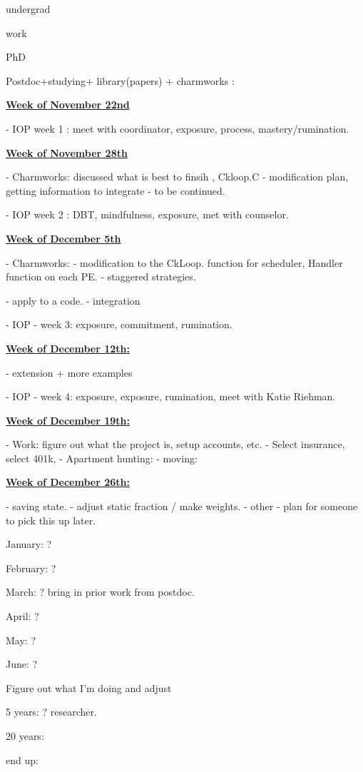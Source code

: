undergrad 



work 

PhD 



Postdoc+studying+  library(papers)  + charmworks : 


\underline{{\bf Week of November 22nd } } 

- IOP week 1 : meet with coordinator, exposure, process,
mastery/rumination. 

\underline{{\bf Week of November 28th } } 

- Charmworks: discussed what is best to finsih ,  Ckloop.C -
modification plan, getting information to integrate - to be
continued.  

- IOP week 2 : DBT, mindfulness, exposure,  met with counselor. 

\underline{{\bf Week of December 5th}} 

- Charmworks: 
- modification to the CkLoop.  function for scheduler, Handler
function on each PE. 
- staggered strategies. 

- apply to a code. 
- integration 


- IOP - week 3: exposure, commitment, rumination. 

\underline{\bf{Week of December 12th: }} 

- extension + more examples 

- IOP - week 4: exposure, exposure, rumination,   meet with Katie
Riehman. 



\bf{\underline{Week of December 19th: } }

- Work: figure out what the project is, setup accounts, etc. 
- Select insurance, select 401k, 
- Apartment hunting:  
- moving: 

\underline{\textbf{Week of December 26th: }} 

- saving state. 
- adjust static fraction / make weights.  
- other 
- plan for someone to pick this up later.  







January:  ? 

February: ? 
 
March: ?  bring in prior work from postdoc. 

April: ? 
   
May: ? 

June: ? 

Figure out what I'm doing and adjust  


5 years: ? researcher. 


20 years: 


end up:  
